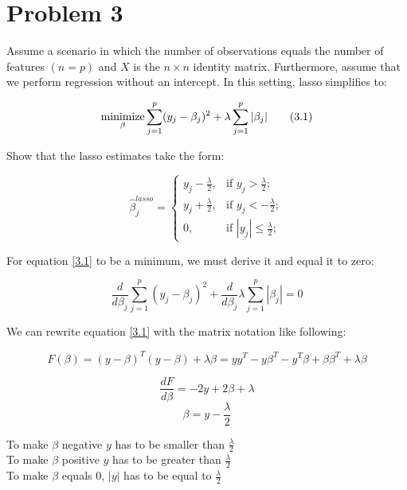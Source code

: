 \section*{Problem 3}

Assume a scenario in which the number of observations equals the number of features $(n=p)$ and $X$ is the $n \times n$ identity matrix. Furthermore, assume that we perform regression without an intercept. In this setting, lasso simplifies to:



\[
\operatorname*{minimize}_{\beta} \sum_{j=1}^{p} (y_j - \beta_j)^2 + \lambda \sum_{j=1}^{p} |\beta_j| \tag{3.1} \label{3.1}
\]

Show that the lasso estimates take the form: 

\[ 
  \tag{3.2} \label{3.2}
  \hat{\beta}_{j}^{lasso}=
  \begin{cases}
		y_j - \frac{\lambda}{2}, &\text{if } y_j > \frac{\lambda}{2};\\
		y_j + \frac{\lambda}{2}, &\text{if } y_j < -\frac{\lambda}{2};\\
		0,                       &\text{if } |y_j| \leq \frac{\lambda}{2};
	\end{cases} 
\]

For equation \ref{3.1} to be a minimum, we must derive it and equal it to zero:

\[ 
\tag{3.3}\label{3.3}
	\frac{d}{d\beta_j} \sum_{j=1}^{p} (y_j - \beta_j)^2 + \frac{d}{d\beta_j} \lambda \sum_{j=1}^{p} |\beta_j| = 0
 \]
 
 We can rewrite equation \ref{3.1} with the matrix notation like following:
 
 \[ 
	 F(\beta) = (y - \beta)^T (y - \beta) + \lambda \beta 
	 = yy^T - y\beta^T -y^T\beta + \beta\beta^T + \lambda\beta
  \]
 
 

 \[ \frac{dF}{d\beta} = -2y + 2\beta + \lambda \]
 \[ \beta = y - \frac{\lambda}{2} \]
 
 
 
 \noindent To make $\beta$ negative $y$ has to be smaller than $\frac{\lambda}{2}$\\
 To make $\beta$ positive $y$ has to be greater than $\frac{\lambda}{2}$\\
 To make $\beta$ equals $0$, $|y|$ has to be equal to $\frac{\lambda}{2}$\\
 